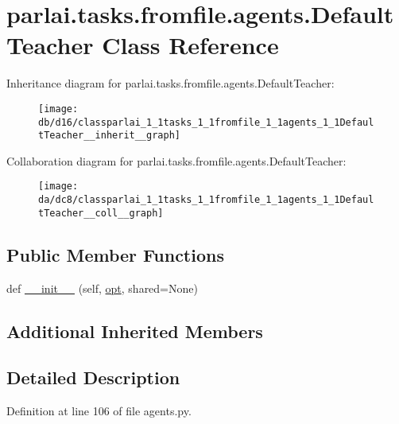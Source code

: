 \hypertarget{classparlai_1_1tasks_1_1fromfile_1_1agents_1_1DefaultTeacher}{}\section{parlai.\+tasks.\+fromfile.\+agents.\+Default\+Teacher Class Reference}
\label{classparlai_1_1tasks_1_1fromfile_1_1agents_1_1DefaultTeacher}


Inheritance diagram for parlai.\+tasks.\+fromfile.\+agents.\+Default\+Teacher\+:\nopagebreak
\begin{figure}[H]
\begin{center}
\leavevmode
\texttt{[image: db/d16/classparlai\_1\_1tasks\_1\_1fromfile\_1\_1agents\_1\_1DefaultTeacher\_\_inherit\_\_graph]}
\end{center}
\end{figure}


Collaboration diagram for parlai.\+tasks.\+fromfile.\+agents.\+Default\+Teacher\+:\nopagebreak
\begin{figure}[H]
\begin{center}
\leavevmode
\texttt{[image: da/dc8/classparlai\_1\_1tasks\_1\_1fromfile\_1\_1agents\_1\_1DefaultTeacher\_\_coll\_\_graph]}
\end{center}
\end{figure}
\subsection*{Public Member Functions}
\begin{DoxyCompactItemize}
\item 
def \hyperlink{classparlai_1_1tasks_1_1fromfile_1_1agents_1_1DefaultTeacher_a4193d0c62cc2b0a602b6b53cf34e43f1}{\+\_\+\+\_\+init\+\_\+\+\_\+} (self, \hyperlink{classparlai_1_1core_1_1agents_1_1Teacher_a3ce6243860ce978a897922863ed32fa4}{opt}, shared=None)
\end{DoxyCompactItemize}
\subsection*{Additional Inherited Members}


\subsection{Detailed Description}


Definition at line 106 of file agents.\+py.



